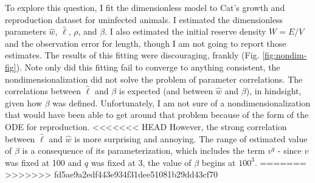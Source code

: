 \documentclass[12pt,reqno,final,pdftex]{amsart}\usepackage[]{graphicx}\usepackage[]{color}
\theoremstyle{plain}
\numberwithin{equation}{part}
\begin{document}
To explore this question, I fit the dimensionless model to Cat's growth and reproduction dataset for uninfected animals.
I estimated the dimensionless parameters $\hat{w}$, $\hat{\ell}$, $\rho$, and $\beta$.
I also estimated the initial reserve density $W=E/V$ and the observation error for length, though I am not going to report those estimates.
The results of this fitting were discouraging, frankly (Fig. \ref{fig:nondim-fig}).
Note only did this fitting fail to converge to anything consistent, the nondimensionalization did not solve the problem of parameter correlations.
The correlations between $\hat{\ell}$ and $\beta$ is expected (and between $\hat{w}$ and $\beta$), in hindsight, given how $\beta$ was defined.
Unfortunately, I am not sure of a nondimensionalization that would have been able to get around that problem because of the form of the ODE for reproduction.
<<<<<<< HEAD
However, the strong correlation between $\hat{\ell}$ and $\hat{w}$ is more surprising and annoying.
The range of estimated value of $\beta$ is a consequence of its parameterization, which includes the term $v^q$ - since $v$ was fixed at 100 and $q$ was fixed at 3, the value of $\beta$ begins at $100^3$.
=======
>>>>>>> fd5ae9a2edf443e934f31dee51081b29dd43cf70
\end{document}
